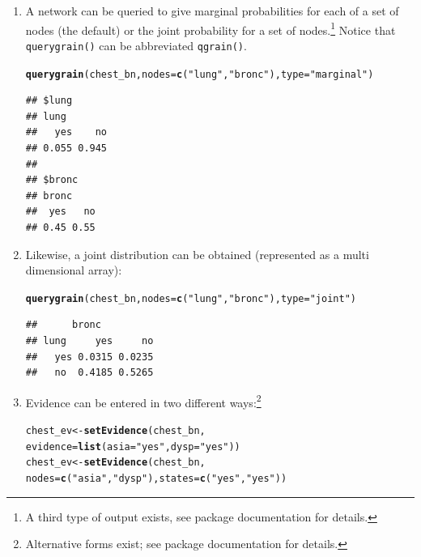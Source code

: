 \documentclass[10pt]{article}\usepackage[]{graphicx}\usepackage[]{xcolor}
\makeatletter
\newcommand{\hlstr}[1]{\textcolor[rgb]{0.192,0.494,0.8}{#1}}%
\newcommand{\hlstd}[1]{\textcolor[rgb]{0.345,0.345,0.345}{#1}}%
\newcommand{\hlkwb}[1]{\textcolor[rgb]{0.69,0.353,0.396}{#1}}%
\newcommand{\hlkwc}[1]{\textcolor[rgb]{0.333,0.667,0.333}{#1}}%
\newcommand{\hlkwd}[1]{\textcolor[rgb]{0.737,0.353,0.396}{\textbf{#1}}}%
\newenvironment{kframe}{%
 \def\at@end@of@kframe{}%
 \ifinner\ifhmode%
  \def\at@end@of@kframe{\end{minipage}}%
  \begin{minipage}{\columnwidth}%
 \fi\fi%
 \def\FrameCommand##1{\hskip\@totalleftmargin \hskip-\fboxsep
 \colorbox{shadecolor}{##1}\hskip-\fboxsep
     \hskip-\linewidth \hskip-\@totalleftmargin \hskip\columnwidth}%
 \MakeFramed {\advance\hsize-\width
   \@totalleftmargin\z@ \linewidth\hsize
   \@setminipage}}%
 {\par\unskip\endMakeFramed%
 \at@end@of@kframe}
\newenvironment{knitrout}{}{} %
\def\code#1{{\texttt{#1}}}
\makeatother
\begin{document}
\begin{enumerate}
\item A network can be queried to give marginal probabilities for
  each of a set of nodes (the default) or the joint probability for a
  set of nodes.\footnote{A third type of output exists, see package
    documentation for details.}  Notice that \code{querygrain()} can
  be abbreviated \code{qgrain()}.

\begin{knitrout}
\color{fgcolor}\begin{kframe}
\begin{alltt}
\hlkwd{querygrain}\hlstd{(chest_bn,} \hlkwc{nodes}\hlstd{=}\hlkwd{c}\hlstd{(}\hlstr{"lung"}\hlstd{,} \hlstr{"bronc"}\hlstd{),} \hlkwc{type}\hlstd{=}\hlstr{"marginal"}\hlstd{)}
\end{alltt}
\begin{verbatim}
## $lung
## lung
##   yes    no 
## 0.055 0.945 
## 
## $bronc
## bronc
##  yes   no 
## 0.45 0.55
\end{verbatim}
\end{kframe}
\end{knitrout}


\item Likewise, a joint distribution can be obtained (represented as a
  multi dimensional array):

\begin{knitrout}
\color{fgcolor}\begin{kframe}
\begin{alltt}
\hlkwd{querygrain}\hlstd{(chest_bn,} \hlkwc{nodes}\hlstd{=}\hlkwd{c}\hlstd{(}\hlstr{"lung"}\hlstd{,} \hlstr{"bronc"}\hlstd{),} \hlkwc{type}\hlstd{=}\hlstr{"joint"}\hlstd{)}
\end{alltt}
\begin{verbatim}
##      bronc
## lung     yes     no
##   yes 0.0315 0.0235
##   no  0.4185 0.5265
\end{verbatim}
\end{kframe}
\end{knitrout}

\item Evidence can be entered in two different ways:\footnote{Alternative forms
    exist; see package documentation for details.}

\begin{knitrout}
\color{fgcolor}\begin{kframe}
\begin{alltt}
\hlstd{chest_ev}  \hlkwb{<-} \hlkwd{setEvidence}\hlstd{(chest_bn,}
                          \hlkwc{evidence}\hlstd{=}\hlkwd{list}\hlstd{(}\hlkwc{asia}\hlstd{=}\hlstr{"yes"}\hlstd{,} \hlkwc{dysp}\hlstd{=}\hlstr{"yes"}\hlstd{))}
\hlstd{chest_ev}  \hlkwb{<-} \hlkwd{setEvidence}\hlstd{(chest_bn,}
                          \hlkwc{nodes}\hlstd{=}\hlkwd{c}\hlstd{(}\hlstr{"asia"}\hlstd{,} \hlstr{"dysp"}\hlstd{),} \hlkwc{states}\hlstd{=}\hlkwd{c}\hlstd{(}\hlstr{"yes"}\hlstd{,} \hlstr{"yes"}\hlstd{))}


\end{alltt}
\end{kframe}
\end{knitrout}
\end{enumerate}
\end{document}
